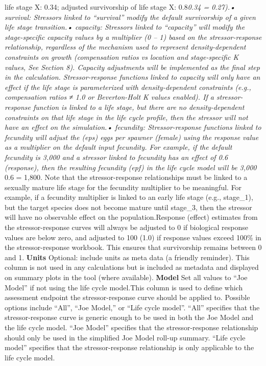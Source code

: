\documentclass[
  letterpaper,
  DIV=11,
  numbers=noendperiod]{scrreprt}
\begin{document}
life stage X: 0.34; adjusted survivorship of life stage X: 0.8\emph{0.34
= 0.27).• survival: Stressors linked to ``survival'' modify the default
survivorship of a given life stage transition.• capacity: Stressors
linked to ``capacity'' will modify the stage-specific capacity values by
a multiplier (0 -- 1) based on the stressor-response relationship,
regardless of the mechanism used to represent density-dependent
constraints on growth (compensation ratios vs location and
stage-specific K values, See Section 8). Capacity adjustments will be
implemented as the final step in the calculation. Stressor-response
functions linked to capacity will only have an effect if the life stage
is parameterized with density-dependent constraints (e.g., compensation
ratios ≠ 1.0 or Beverton-Holt K values enabled). If a stressor-response
function is linked to a life stage, but there are no density-dependent
constraints on that life stage in the life cycle profile, then the
stressor will not have an effect on the simulation.• fecundity:
Stressor-response functions linked to fecundity will adjust the (eps)
eggs per spawner (female) using the response value as a multiplier on
the default input fecundity. For example, if the default fecundity is
3,000 and a stressor linked to fecundity has an effect of 0.6
(response), then the resulting fecundity (epf) in the life cycle model
will be 3,000 } 0.6 = 1,800. Note that the stressor-response
relationships must be linked to a sexually mature life stage for the
fecundity multiplier to be meaningful. For example, if a fecundity
multiplier is linked to an early life stage (e.g., stage\_1), but the
target species does not become mature until stage\_3, then the stressor
will have no observable effect on the population.Response (effect)
estimates from the stressor-response curves will always be adjusted to 0
if biological response values are below zero, and adjusted to 100 (1.0)
if response values exceed 100\% in the stressor-response workbook. This
ensures that survivorship remains between 0 and 1. \textbar{} \textbar{}
\textbf{Units} \textbar{} Optional: include units as meta data (a
friendly reminder). This column is not used in any calculations but is
included as metadata and displayed on summary plots in the tool (where
available). \textbar{} \textbar{} \textbf{Model} \textbar{} Set all
values to ``Joe Model'' if not using the life cycle model.This column is
used to define which assessment endpoint the stressor-response curve
should be applied to. Possible options include ``All'', ``Joe Model,''
or ``Life cycle model''. ``All'' specifies that the stressor-response
curve is generic enough to be used in both the Joe Model and the life
cycle model. ``Joe Model'' specifies that the stressor-response
relationship should only be used in the simplified Joe Model roll-up
summary. ``Life cycle model'' specifies that the stressor-response
relationship is only applicable to the life cycle model. \textbar{}
\end{document}
